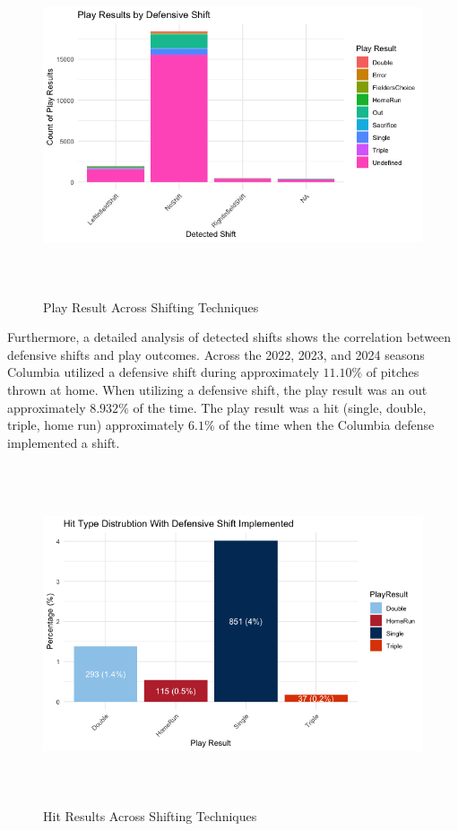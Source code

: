\documentclass{article}
\begin{document}
\newpage

\begin{figure}[h]
    \centering
    \includegraphics[height=10cm]{images/shift_breakdown.png}
    \caption{Play Result Across Shifting Techniques}
\end{figure}
\vspace{1cm}

Furthermore, a detailed analysis of detected shifts shows the correlation between defensive shifts and play outcomes. Across the 2022, 2023, and 2024 seasons Columbia utilized a defensive shift during approximately $11.10\%$ of pitches thrown at home. When utilizing a defensive shift, the play result was an out approximately $8.932\%$ of the time. The play result was a hit (single, double, triple, home run) approximately $6.1\%$ of the time when the Columbia defense implemented a shift. 

\newpage
\begin{figure}[h]
    \centering
    \includegraphics[height=10cm]{images/hits_against_shift.png}
    \caption{Hit Results Across Shifting Techniques}
\end{figure}
\end{document}
